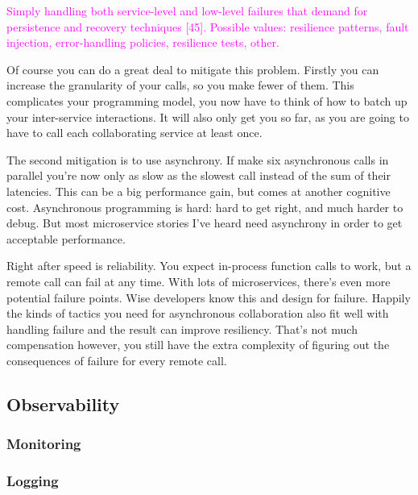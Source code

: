 \documentclass[thesis=M,english,hidelinks]{FITthesis}[2012/10/20]
\begin{document}
\textcolor{magenta}{Simply handling both service-level and low-level failures that demand for persistence and recovery techniques [45]. Possible values: resilience patterns, fault injection, error-handling policies, resilience tests, other.}



Of course you can do a great deal to mitigate this problem. Firstly you can increase the granularity of your calls, so you make fewer of them. This complicates your programming model, you now have to think of how to batch up your inter-service interactions. It will also only get you so far, as you are going to have to call each collaborating service at least once.

The second mitigation is to use asynchrony. If make six asynchronous calls in parallel you're now only as slow as the slowest call instead of the sum of their latencies. This can be a big performance gain, but comes at another cognitive cost. Asynchronous programming is hard: hard to get right, and much harder to debug. But most microservice stories I've heard need asynchrony in order to get acceptable performance.

Right after speed is reliability. You expect in-process function calls to work, but a remote call can fail at any time. With lots of microservices, there's even more potential failure points. Wise developers know this and design for failure. Happily the kinds of tactics you need for asynchronous collaboration also fit well with handling failure and the result can improve resiliency. That's not much compensation however, you still have the extra complexity of figuring out the consequences of failure for every remote call.

\subsection{Observability}
\subsubsection{Monitoring}
\subsubsection{Logging}



% 
% 
\end{document}
